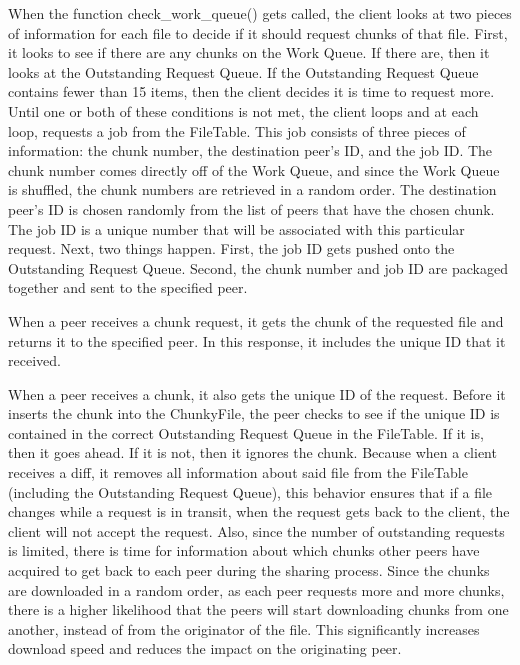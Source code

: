 	When the function check_work_queue() gets called, the client looks at two pieces of information for each file to decide if it should request chunks of that file. First, it looks to see if there are any chunks on the Work Queue. If there are, then it looks at the Outstanding Request Queue. If the Outstanding Request Queue contains fewer than 15 items, then the client decides it is time to request more. Until one or both of these conditions is not met, the client loops and at each loop, requests a job from the FileTable. This job consists of three pieces of information: the chunk number, the destination peer's ID, and the job ID. The chunk number comes directly off of the Work Queue, and since the Work Queue is shuffled, the chunk numbers are retrieved in a random order. The destination peer's ID is chosen randomly from the list of peers that have the chosen chunk. The job ID is a unique number that will be associated with this particular request. Next, two things happen. First, the job ID gets pushed onto the Outstanding Request Queue. Second, the chunk number and job ID are packaged together and sent to the specified peer.
	
	When a peer receives a chunk request, it gets the chunk of the requested file and returns it to the specified peer. In this response, it includes the unique ID that it received.
	
	When a peer receives a chunk, it also gets the unique ID of the request. Before it inserts the chunk into the ChunkyFile, the peer checks to see if the unique ID is contained in the correct Outstanding Request Queue in the FileTable. If it is, then it goes ahead. If it is not, then it ignores the chunk. Because when a client receives a diff, it removes all information about said file from the FileTable (including the Outstanding Request Queue), this behavior ensures that if a file changes while a request is in transit, when the request gets back to the client, the client will not accept the request. Also, since the number of outstanding requests is limited, there is time for information about which chunks other peers have acquired to get back to each peer during the sharing process. Since the chunks are downloaded in a random order, as each peer requests more and more chunks, there is a higher likelihood that the peers will start downloading chunks from one another, instead of from the originator of the file. This significantly increases download speed and reduces the impact on the originating peer.


